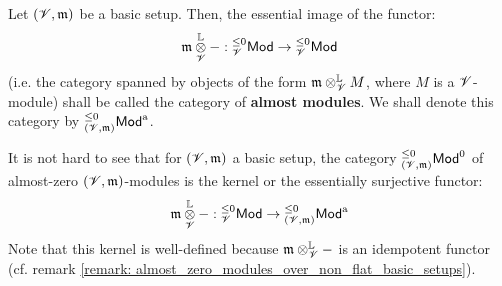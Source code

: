                     \begin{definition} \label{def: almost_modules}
                        Let $(\mathscr{V}, \mathfrak{m})$ be a basic setup. Then, the essential image of the functor:
                            $$\m \tensor_{\scrV}^{\L} -: {}_{\scrV}^{\leq 0}\Mod \to {}_{\scrV}^{\leq 0}\Mod$$
                        (i.e. the category spanned by objects of the form $\m \tensor_{\scrV}^{\L} M$, where $M$ is a $\mathscr{V}$-module) shall be called the category of \textbf{almost modules}. We shall denote this category by ${}_{(\mathscr{V}, \mathfrak{m})}^{\leq 0}\mathsf{Mod}^{\mathrm{a}}$.
                    \end{definition}
                    \begin{remark} \label{remark: categories_of_almost_zero_modules_are_kernels}
                        It is not hard to see that for $(\mathscr{V}, \mathfrak{m})$ a basic setup, the category ${}_{(\mathscr{V}, \mathfrak{m})}^{\leq 0}\mathsf{Mod}^0$ of almost-zero $(\mathscr{V}, \mathfrak{m})$-modules is the kernel or the essentially surjective functor:
                            $$\m \tensor_{\scrV}^{\L} -: {}_{\scrV}^{\leq 0}\Mod \to {}_{(\scrV, \m)}^{\leq 0}\Mod^{\almost}$$
                        Note that this kernel is well-defined because $\m \tensor_{\scrV}^{\L} -$ is an idempotent functor (cf. remark \ref{remark: almost_zero_modules_over_non_flat_basic_setups}).
                    \end{remark}
                    
